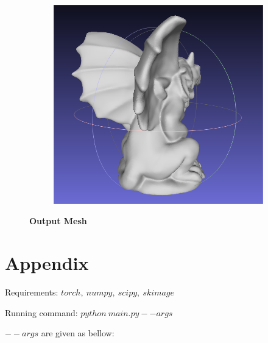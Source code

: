 \documentclass{ctexart}
\begin{document}
\begin{figure}[htbp]
\begin{subfigure}[htbp]{0.24\linewidth}
        \includegraphics[width=0.9\linewidth]{figures/4.png}
    \end{subfigure}
    \caption{\textbf{Output Mesh}}
\end{figure}



\nocite{*}


\appendix
\section{Appendix}
Requirements: $torch,\ numpy,\ scipy,\ skimage$

Running command: $python\ main.py --args$

$--args$ are given as bellow:
\end{document}
